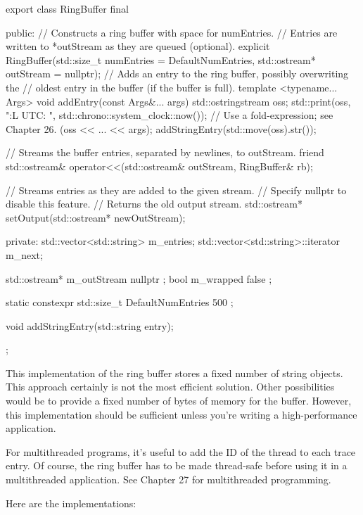 \begin{cpp}
export class RingBuffer final
{
    public:
        // Constructs a ring buffer with space for numEntries.
        // Entries are written to *outStream as they are queued (optional).
        explicit RingBuffer(std::size_t numEntries = DefaultNumEntries,
            std::ostream* outStream = nullptr);
        // Adds an entry to the ring buffer, possibly overwriting the
        // oldest entry in the buffer (if the buffer is full).
        template <typename... Args>
        void addEntry(const Args&... args)
        {
            std::ostringstream oss;
            std::print(oss, "{:L} UTC: ", std::chrono::system_clock::now());
            // Use a fold-expression; see Chapter 26.
            (oss << ... << args);
            addStringEntry(std::move(oss).str());
        }

        // Streams the buffer entries, separated by newlines, to outStream.
        friend std::ostream& operator<<(std::ostream& outStream, RingBuffer& rb);

        // Streams entries as they are added to the given stream.
        // Specify nullptr to disable this feature.
        // Returns the old output stream.
        std::ostream* setOutput(std::ostream* newOutStream);

    private:
        std::vector<std::string> m_entries;
        std::vector<std::string>::iterator m_next;

        std::ostream* m_outStream { nullptr };
        bool m_wrapped { false };

        static constexpr std::size_t DefaultNumEntries { 500 };

        void addStringEntry(std::string entry);
};
\end{cpp}


This implementation of the ring buffer stores a fixed number of string objects. This approach certainly is not the most efficient solution. Other possibilities would be to provide a fixed number of bytes of memory for the buffer. However, this implementation should be sufficient unless you’re writing a high-performance application.

For multithreaded programs, it’s useful to add the ID of the thread to each trace entry. Of course, the ring buffer has to be made thread-safe before using it in a multithreaded application. See Chapter 27 for multithreaded programming.

Here are the implementations:

